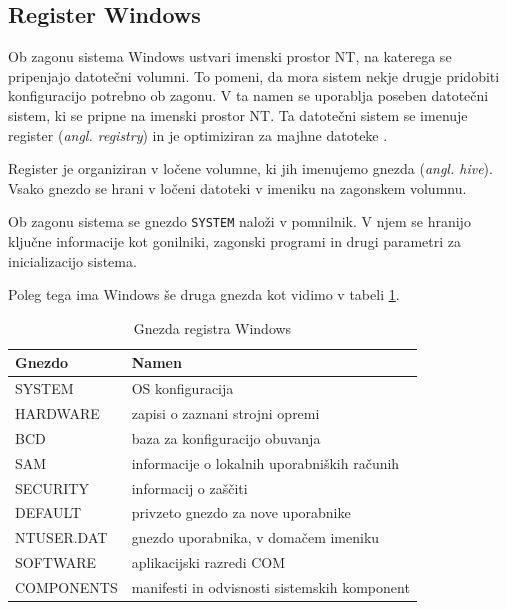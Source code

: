 \documentclass[a4paper,12pt,openright]{book}
\begin{document}
\subsection{Register Windows}

Ob zagonu sistema Windows ustvari imenski prostor NT, na katerega se pripenjajo datotečni volumni.
To pomeni, da mora sistem nekje drugje pridobiti konfiguracijo potrebno ob zagonu.
V ta namen se uporablja poseben datotečni sistem, ki se pripne na imenski prostor NT.
Ta datotečni sistem se imenuje register (\textit{angl. registry}) in je optimiziran za majhne datoteke \cite{Tanenbaum_Bos_2023}.

Register je organiziran v ločene volumne, ki jih imenujemo gnezda (\textit{angl. hive}).
Vsako gnezdo se hrani v ločeni datoteki v imeniku  na zagonskem volumnu.

Ob zagonu sistema se gnezdo \texttt{SYSTEM} naloži v pomnilnik.
V njem se hranijo ključne informacije kot gonilniki, zagonski programi in drugi parametri za inicializacijo sistema.

Poleg tega ima Windows še druga gnezda kot vidimo v tabeli \ref{tab:windows_registry_hives}.

\begin{table}[h!]
	\begin{center}
		\begin{tabular}{ p{3.7cm}|p{8.8cm} }
			Gnezdo     & Namen                                         \\
			\hline
			SYSTEM     & OS konfiguracija                              \\
			HARDWARE   & zapisi o zaznani strojni opremi               \\
			BCD        & baza za konfiguracijo obuvanja                \\
			SAM        & informacije o lokalnih uporabniških računih \\
			SECURITY   & informacij o zaščiti                        \\
			DEFAULT    & privzeto gnezdo za nove uporabnike            \\
			NTUSER.DAT & gnezdo uporabnika, v domačem imeniku         \\
			SOFTWARE   & aplikacijski razredi COM                      \\
			COMPONENTS & manifesti in odvisnosti sistemskih komponent  \\
		\end{tabular}
	\end{center}
	\caption{Gnezda registra Windows \cite{Tanenbaum_Bos_2023}}
	\label{tab:windows_registry_hives}
\end{table}
\end{document}
